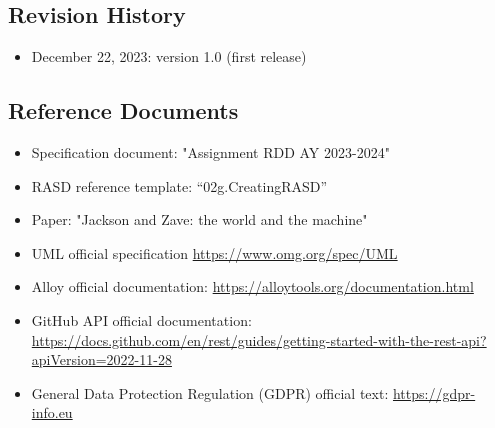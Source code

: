 \subsection{Revision History}
\begin{itemize}
    \item December 22, 2023: version 1.0 (first release)
\end{itemize}
\subsection{Reference Documents}
\begin{itemize}
    \item Specification document: "Assignment RDD AY 2023-2024"
    \item RASD reference template: “02g.CreatingRASD”
    \item Paper: "Jackson and Zave: the world and the machine"
    \item UML official specification \href{https://www.omg.org/spec/UML}{https://www.omg.org/spec/UML}
    \item Alloy official documentation: \href{https://alloytools.org/documentation.html}{https://alloytools.org/documentation.html}
    \item GitHub API official documentation: \href{https://docs.github.com/en/rest/guides/getting-started-with-the-rest-api?apiVersion=2022-11-28}{https://docs.github.com/en/rest/guides/getting-started-with-the-rest-api?apiVersion=2022-11-28}
    \item General Data Protection Regulation (GDPR) official text: \href{https://gdpr-info.eu}{https://gdpr-info.eu}
\end{itemize}

